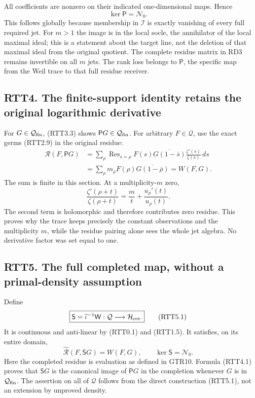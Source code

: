 All coefficients are nonzero on their indicated one-dimensional maps.
Hence \[
\ker\mathsf P=\mathcal N_0.
\tag{RTT3.4}
\] This follows globally because membership in \(\mathcal I\) is exactly
vanishing of every full required jet. For \(m>1\) the image is in the
local socle, the annihilator of the local maximal ideal; this is a
statement about the target line, not the deletion of that maximal ideal
from the original quotient. The complete residue matrix in RD3 remains
invertible on all \(m\) jets. The rank loss belongs to \(\mathsf P\),
the specific map from the Weil trace to that full residue receiver.

\subsection{RTT4. The finite-support identity retains the original
logarithmic
derivative}\label{rtt4.-the-finite-support-identity-retains-the-original-logarithmic-derivative}

For \(G\in\mathcal Q_{\rm fin}\), (RTT3.3) shows
\(\mathsf P G\in\mathcal Q_{\rm fin}\). For arbitrary
\(F\in\mathcal Q\), use the exact germs (RTT2.9) in the original
residue: \[
\begin{aligned}
\mathcal R(F,\mathsf P G)
&=\sum_\rho\operatorname{Res}_{s=\rho}
F(s)\overline{G(1-\overline s)}\frac{\zeta'(s)}{\zeta(s)}\,ds\\
&=\sum_\rho m_\rho F(\rho)\overline{G(1-\overline\rho)}
=W(F,G).
\end{aligned}
\tag{RTT4.1}
\] The sum is finite in this section. At a multiplicity-\(m\) zero, \[
\frac{\zeta'(\rho+t)}{\zeta(\rho+t)}=
\frac m t+\frac{u_\rho'(t)}{u_\rho(t)}.
\tag{RTT4.2}
\] The second term is holomorphic and therefore contributes zero
residue. This proves why the trace keeps precisely the constant
observations and the multiplicity \(m\), while the residue pairing alone
sees the whole jet algebra. No derivative factor was set equal to one.

\subsection{RTT5. The full completed map, without a primal-density
assumption}\label{rtt5.-the-full-completed-map-without-a-primal-density-assumption}

Define \[
\boxed{\mathsf S=\widehat\iota^{-1}\mathsf W:
\mathcal Q\longrightarrow\mathcal H_{\rm res}.}
\tag{RTT5.1}
\] It is continuous and anti-linear by (RTT0.1) and (RTT1.5). It
satisfies, on its entire domain, \[
\widehat{\mathcal R}(F,\mathsf S G)=W(F,G),\qquad
\ker\mathsf S=\mathcal N_0.
\tag{RTT5.2}
\] Here the completed residue is evaluation as defined in GTR10. Formula
(RTT4.1) proves that \(\mathsf S G\) is the canonical image of
\(\mathsf P G\) in the completion whenever \(G\) is in
\(\mathcal Q_{\rm fin}\). The assertion on all of \(\mathcal Q\) follows
from the direct construction (RTT5.1), not an extension by unproved
density.

